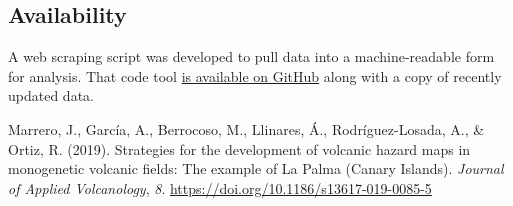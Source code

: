 \documentclass[
]{agujournal2019}
\newlength{\cslentryspacing}
\begin{document}
\subsection*{Availability}\label{availability}

A web scraping script was developed to pull data into a machine-readable
form for analysis. That code tool
\href{https://github.com/stevejpurves/ign-earthquake-data}{is available
on GitHub} along with a copy of recently updated data.

\label{refs}
\setlength{\cslentryspacing}{0em}
\begin{CSLReferences}
Marrero, J., García, A., Berrocoso, M., Llinares, Á., Rodríguez-Losada,
A., \& Ortiz, R. (2019). Strategies for the development of volcanic
hazard maps in monogenetic volcanic fields: The example of {La} {Palma}
({Canary} {Islands}). \emph{Journal of Applied Volcanology}, \emph{8}.
\url{https://doi.org/10.1186/s13617-019-0085-5}

\end{CSLReferences}
\end{document}
